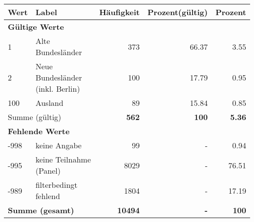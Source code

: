      \begin{longtable}{lXrrr}
     \toprule
     \textbf{Wert} & \textbf{Label} & \textbf{Häufigkeit} & \textbf{Prozent(gültig)} & \textbf{Prozent} \\
     \endhead
     \midrule
     \multicolumn{5}{l}{\textbf{Gültige Werte}}\\

     1 &
     \multicolumn{1}{X}{ Alte Bundesländer   } &


       \num{373} &
       \num[round-mode=places,round-precision=2]{66.37} &
         \num[round-mode=places,round-precision=2]{3.55} \\

     2 &
     \multicolumn{1}{X}{ Neue Bundesländer (inkl. Berlin)   } &


       \num{100} &
       \num[round-mode=places,round-precision=2]{17.79} &
         \num[round-mode=places,round-precision=2]{0.95} \\

     100 &
     \multicolumn{1}{X}{ Ausland   } &


       \num{89} &
       \num[round-mode=places,round-precision=2]{15.84} &
         \num[round-mode=places,round-precision=2]{0.85} \\
     \midrule
     \multicolumn{2}{l}{Summe (gültig)} &
       \textbf{\num{562}} &
     \textbf{\num{100}} &
       \textbf{\num[round-mode=places,round-precision=2]{5.36}} \\
     \multicolumn{5}{l}{\textbf{Fehlende Werte}}\\
       -998 &
       keine Angabe &
         \num{99} &
        - &
         \num[round-mode=places,round-precision=2]{0.94} \\
       -995 &
       keine Teilnahme (Panel) &
         \num{8029} &
        - &
         \num[round-mode=places,round-precision=2]{76.51} \\
       -989 &
       filterbedingt fehlend &
         \num{1804} &
        - &
         \num[round-mode=places,round-precision=2]{17.19} \\
     \midrule
     \multicolumn{2}{l}{\textbf{Summe (gesamt)}} &
          \textbf{\num{10494}} &
        \textbf{-} &
        \textbf{\num{100}} \\
     \bottomrule
     \end{longtable}
     
